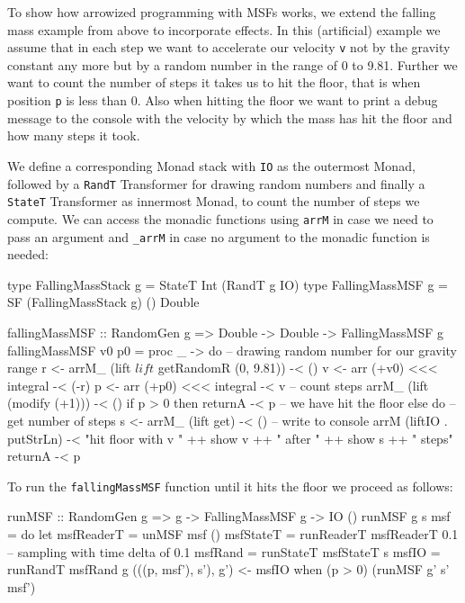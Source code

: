 To show how arrowized programming with MSFs works, we extend the falling mass example from above to incorporate effects. In this (artificial) example we assume that in each step we want to accelerate our velocity \texttt{v} not by the gravity constant any more but by a random number in the range of 0 to 9.81. Further we want to count the number of steps it takes us to hit the floor, that is when position \texttt{p} is less than 0. Also when hitting the floor we want to print a debug message to the console with the velocity by which the mass has hit the floor and how many steps it took.

We define a corresponding Monad stack with \texttt{IO} as the outermost Monad, followed by a \texttt{RandT} Transformer for drawing random numbers and finally a \texttt{StateT} Transformer as innermost Monad, to count the number of steps we compute. We can access the monadic functions using \texttt{arrM} in case we need to pass an argument and \texttt{\_arrM} in case no argument to the monadic function is needed:

\begin{HaskellCode}
type FallingMassStack g = StateT Int (RandT g IO)
type FallingMassMSF g   = SF (FallingMassStack g) () Double

fallingMassMSF :: RandomGen g => Double -> Double -> FallingMassMSF g
fallingMassMSF v0 p0 = proc _ -> do
  -- drawing random number for our gravity range
  r <- arrM_ (lift $ lift $ getRandomR (0, 9.81)) -< ()
  v <- arr (+v0) <<< integral -< (-r)
  p <- arr (+p0) <<< integral -< v
  -- count steps
  arrM_ (lift (modify (+1))) -< ()
  if p > 0
    then returnA -< p
    -- we have hit the floor
    else do
      -- get number of steps
      s <- arrM_ (lift get) -< ()
      -- write to console
      arrM (liftIO . putStrLn) -< "hit floor with v " ++ show v ++ 
                                  " after " ++ show s ++ " steps"
      returnA -< p
\end{HaskellCode}

To run the \texttt{fallingMassMSF} function until it hits the floor we proceed as follows:

\begin{HaskellCode}
runMSF :: RandomGen g => g -> FallingMassMSF g -> IO ()
runMSF g s msf = do
  let msfReaderT = unMSF msf ()
      msfStateT  = runReaderT msfReaderT 0.1 -- sampling with time delta of 0.1
      msfRand    = runStateT msfStateT s
      msfIO      = runRandT msfRand g
  (((p, msf'), s'), g') <- msfIO
  when (p > 0) (runMSF g' s' msf')
\end{HaskellCode}


